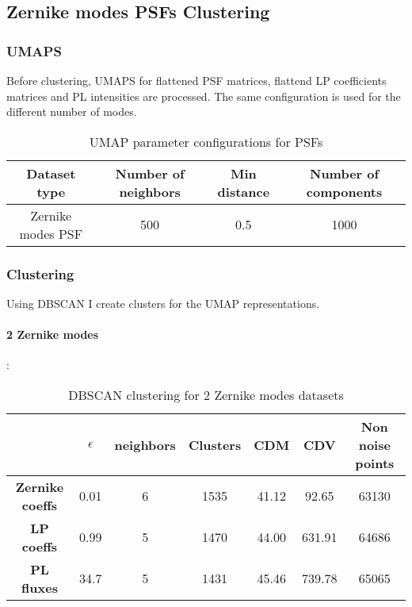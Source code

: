 \subsection{Zernike modes PSFs Clustering}

	\subsubsection{UMAPS}
		
		Before clustering, UMAPS for flattened PSF matrices, flattend LP coefficients matrices and PL intensities are processed. The same configuration is used for the different number of modes.
		
		\begin{table}[h!]
			\centering
			\begin{tabular}{|c|c|c|c|}
				\hline
				\textbf{Dataset type} & \textbf{Number of neighbors} & \textbf{Min distance} & \textbf{Number of components} \\
				\hline
				Zernike modes PSF & 500 & 0.5 & 1000 \\
				\hline
			\end{tabular}
		\caption{UMAP parameter configurations for PSFs}
		\end{table}
		
	
	\subsubsection{Clustering}
		
		Using DBSCAN I create clusters for the UMAP representations.
		
		\paragraph{2 Zernike modes}:
		\begin{table}[h!]
			\centering
			\begin{tabular}{|c|c|c|c|c|c|c|}
				\hline
				\textbf{} & \textbf{$\epsilon$} & \textbf{neighbors} & \textbf{Clusters} & \textbf{CDM} & \textbf{CDV} & \textbf{Non noise points}\\
				\hline
				\textbf{Zernike coeffs} & 0.01 & 6 & 1535 & 41.12 & 92.65 & 63130 \\
				\hline
				\textbf{LP coeffs} & 0.99 & 5 & 1470 & 44.00 & 631.91 & 64686 \\
				\hline
				\textbf{PL fluxes} & 34.7 & 5 & 1431 & 45.46 & 739.78 & 65065 \\
				\hline
			\end{tabular}
		\caption{DBSCAN clustering for 2 Zernike modes datasets}
		\end{table}
		\FloatBarrier
		
